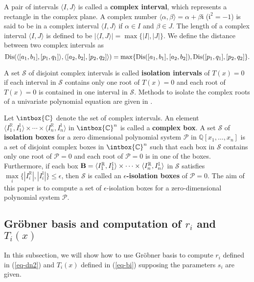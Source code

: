 \documentclass[amsthm]{JSC_LaTex_2007_Mar_12/elsart}
\def\bref#1{(\ref{#1})}
\def\R{{\mathbb{R}}}
\def\C{{\mathbb{C}}}
\def\Q{{\mathbb{Q}}}
\def\I{{\mathbb{I}}}
\def\B{{\bf B}}
\def\Dis{\hbox{\rm{Dis}}}
\begin{document}
A pair of intervals  $\langle I,J\rangle$ is called a {\bf complex
interval}, which represents a rectangle in the complex plane. A
complex number $\langle \alpha, \beta \rangle=\alpha+\beta
\mathfrak{i}$ ($\mathfrak{i}^2=-1$) is said to be in a complex
interval $\langle I, J \rangle$ if $\alpha\in I$ and  $\beta\in J$.
 The length of a complex interval $\langle I,J\rangle$ is defined to
be $|\langle I,J\rangle|=\max\{|I|, |J|\}$.
We define the distance between two complex intervals as {\small
\begin{equation}\label{eq-rtsep} \Dis(\langle [a_1,b_1],
[p_1,q_1]\rangle,\langle [a_2,b_2], [p_2,q_2]\rangle)=
\max\{\Dis([a_1,b_1],[a_2,b_2]),\Dis([p_1,q_1],[p_2,q_2]\}.
\end{equation}}

A set $\mathcal{S}$ of disjoint complex intervals  is called {\bf
isolation intervals} of $T(x)=0$ if each interval in $\mathcal{S}$
contains only one root of $T(x)=0$ and each root of $T(x)=0$ is
contained in one interval in $\mathcal{S}$.
Methods to isolate the complex roots of a univariate polynomial
equation are given in \cite{collins-c1,pinkert,sy,wilf}.

Let $\intbox \C$ denote the set of complex intervals. An element
$\langle I^{\R}_1, I^{\I}_1\rangle\times\cdots\times\langle
I^{\R}_n, I^{\I}_n\rangle$ in $\intbox \C^n$ is called a {\bf
complex box}.
A set $\mathcal{S}$ of {\bf isolation boxes} for a zero dimensional
polynomial system $\mathcal{P}$ in $\Q[x_1,\ldots,x_n]$ is a set of
disjoint complex boxes in  $\intbox \C^n$ such that each box in
$\mathcal{S}$ contains only one root of $\mathcal{P}=0$ and each
root of $\mathcal{P}=0$ is in one of the boxes.
Furthermore,  if each box  $\B=\langle I^{\R}_1,
I^{\I}_1\rangle\times\cdots\times\langle I^{\R}_n, I^{\I}_n\rangle$
in $\mathcal{S}$ satisfies $\max\limits_i\{|I^{\R}_i|,
|I^{\I}_i|\}\le\epsilon$, then $\mathcal{S}$ is called an {\bf
$\epsilon$-isolation boxes} of $\mathcal{P}=0$.
The aim of this paper is to compute a set of $\epsilon$-isolation
boxes for a zero-dimensional polynomial system $\mathcal{P}$.

\subsection{Gr\"obner basis and computation of $r_i$ and $T_i(x)$}
In this subsection, we will show how to use Gr\"obner basis to
compute $r_i$ defined in \bref{eq-dn2} and $T_i(x)$ defined in
\bref{eq-bi} supposing the parameters $s_i$ are given.
\end{document}
